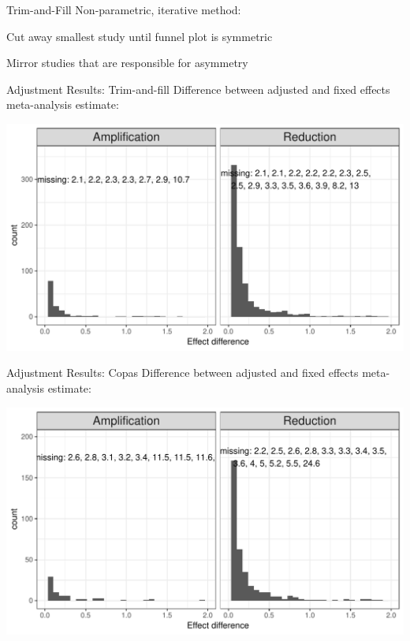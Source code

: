 \documentclass[english]{beamer}\usepackage[]{graphicx}\usepackage[]{color}
\makeatletter
\def\maxwidth{ %
  \ifdim\Gin@nat@width>\linewidth
    \linewidth
  \else
    \Gin@nat@width
  \fi
}
\newenvironment{knitrout}{}{} %
\makeatother
\begin{document}
\begin{frame}{Trim-and-Fill}
Non-parametric, iterative method:

Cut away smallest study until funnel plot is symmetric

Mirror studies that are responsible for asymmetry
\end{frame}

\begin{frame}[fragile]{Adjustment Results: Trim-and-fill}
Difference between adjusted and fixed effects meta-analysis estimate:

\vspace{-3mm}
\begin{knitrout}
\color{fgcolor}
\includegraphics[width=\maxwidth]{figure/unnamed-chunk-12-1} 

\end{knitrout}
\end{frame}


\begin{frame}[fragile]{Adjustment Results: Copas}
Difference between adjusted and fixed effects meta-analysis estimate:

\vspace{-3mm}
\begin{knitrout}
\color{fgcolor}
\includegraphics[width=\maxwidth]{figure/unnamed-chunk-13-1} 

\end{knitrout}
\end{frame}
\end{document}
